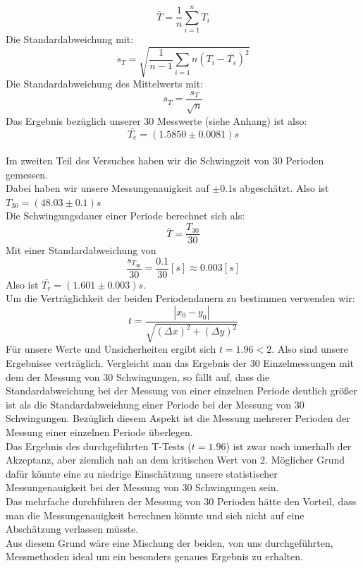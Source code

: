 \documentclass[11pt,a4paper]{article}
\begin{document}
	\begin{equation}
	\bar{T} = \frac{1}{n} \sum_{i=1}^{n} T_i		
	\end{equation}
	Die Standardabweichung mit:
	\begin{equation}
	s_T=\sqrt{\frac{1}{n-1}\sum_{i=1}{n} (T_i - \bar{T_s})^2}
	\end{equation}
	Die Standardabweichung des Mittelwerts mit:
	\begin{equation}
	s_{\bar{T}}=\frac{s_T}{\sqrt{n}}
	\end{equation}
	Das Ergebnis bezüglich unserer 30 Messwerte (siehe Anhang) ist also:
	\begin{equation*}
	\bar{T_e}=(1.5850 \pm 0.0081)s
	\end{equation*}
	\\
	Im zweiten Teil des Versuches haben wir die Schwingzeit von 30 Perioden gemessen. \\
	Dabei haben wir unsere Messungenauigkeit auf $\pm 0.1$s abgeschätzt. Also ist $T_{30}=(48.03\pm 0.1)s$
	\\
	Die Schwingungsdauer einer Periode berechnet sich als:
	\begin{equation*}
	\bar{T}=\frac{T_{30}}{30}
	\end{equation*}
	Mit einer Standardabweichung von $$\frac{s_{T_{30}}}{30}=\frac{0.1}{30}[s]\approx 0.003[s]$$
	Also ist $\bar{T_r}=(1.601\pm 0.003)s$. \\
	Um die Verträglichkeit der beiden Periodendauern zu bestimmen verwenden wir:
	\begin{equation}
	t=\frac{ |x_0 -y_0|}{\sqrt{(\Delta x)^2 + (\Delta y)^2}}
	\end{equation}
	Für unsere Werte und Unsicherheiten ergibt sich $t=1.96<2$. Also sind unsere Ergebnisse verträglich.
	\newpage 
	Vergleicht man das Ergebnis der 30 Einzelmessungen mit dem der Messung von 30 Schwingungen,
	so fällt auf, dass die Standardabweichung bei der Messung von einer einzelnen Periode deutlich 
	größer ist als die Standardabweichung einer Periode bei der Messung von 30 Schwingungen.
	Bezüglich diesem Aspekt ist die Messung mehrerer Perioden der Messung einer einzelnen Periode überlegen.
	\\
	Das Ergebnis des durchgeführten T-Tests ($t=1.96$) ist zwar noch innerhalb der Akzeptanz, aber
	ziemlich nah an dem kritischen Wert von 2.
	Möglicher Grund dafür könnte eine zu niedrige Einschätzung unsere statistischer Messungenauigkeit bei der Messung von 30 Schwingungen sein.
	\\Das mehrfache durchführen der Messung von 30 Perioden hätte den Vorteil, dass man die Messungenauigkeit berechnen könnte und sich nicht auf eine Abschätzung verlassen müsste.
	\\
	Aus diesem Grund wäre eine Mischung der beiden, von uns durchgeführten, Messmethoden ideal um ein
	besonders genaues Ergebnis zu erhalten.
	
\end{document}
